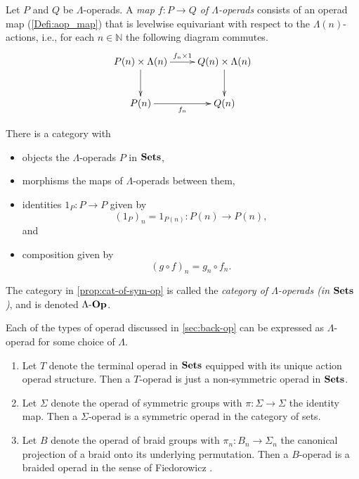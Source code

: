 \begin{Defi}\label{Defi:aop_map}
Let $P$ and $Q$ be $\Lambda$-operads. A \emph{map $f \colon P \rightarrow Q$ of $\Lambda$-operads} consists of an operad map (\ref{Defi:aop_map}) that is levelwise equivariant with respect to the $\Lambda(n)$-actions, i.e., for each $n \in \mathbb{N}$ the following diagram commutes.
  \[
    \xy
      (0,0)*+{P(n) \times \Lambda(n)}="00";
      (30,0)*+{Q(n) \times \Lambda(n)}="10";
      (30,-15)*+{Q(n)}="11";
      (0,-15)*+{P(n)}="01";
      {\ar^{f_n \times 1} "00";"10"};
      {\ar "10";"11"};
      {\ar "00";"01"};
      {\ar_{f_n} "01";"11"};
    \endxy
  \]
\end{Defi}

\begin{prop}\label{prop:cat-of-L-op}
There is a category with 
\begin{itemize}
\item objects the $\Lambda$-operads $P$ in $\mathbf{Sets}$, 
\item morphisms the maps of $\Lambda$-operads between them,
\item identities $1_P \colon P \to P$ given by
\[
(1_P)_n = 1_{P(n)} \colon P(n) \to P(n),
\]
and
\item composition given by
\[
(g \circ f)_n = g_n \circ f_n.
\]
\end{itemize}
\end{prop}

\begin{nota}\label{nota:cat-of-L-op}
The category in \cref{prop:cat-of-sym-op} is called the \emph{category of $\Lambda$-operads (in $\mathbf{Sets}$)}, and is denoted $\Lambda\mbox{-}\mathbf{Op}$.
\end{nota}


\begin{example}\label{ex:lop-exs}
Each of the types of operad discussed in \cref{sec:back-op} can be expressed as $\Lambda$-operad for some choice of $\Lambda$.
  \begin{enumerate}
    \item Let $T$ denote the terminal operad in $\mathbf{Sets}$ equipped with its unique action operad structure. Then a $T$-operad is just a non-symmetric operad in $\mathbf{Sets}$.
    \item Let $\Sigma$ denote the operad of symmetric groups with $\pi \colon \Sigma \rightarrow \Sigma$ the identity map. Then a $\Sigma$-operad is a symmetric operad in the category of sets.
    \item Let $B$ denote the operad of braid groups with $\pi_{n} \colon B_{n} \rightarrow \Sigma_{n}$ the canonical projection of a braid onto its underlying permutation. Then a $B$-operad is a braided operad in the sense of Fiedorowicz \cite{fie-br}.
  \end{enumerate}
\end{example}

